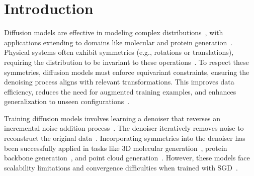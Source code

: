 \vspace{-0.5cm}
\section{Introduction}
\label{sec:intro}


Diffusion models are effective in modeling complex distributions~, with applications extending to domains like molecular and protein generation~. Physical systems often exhibit symmetries (e.g., rotations or translations), requiring the distribution to be invariant to these operations~.  To respect these symmetries, diffusion models must enforce equivariant constraints, ensuring the denoising process aligns with relevant transformations. This improves data efficiency, reduces the need for augmented training examples, and enhances generalization to unseen configurations~.

Training diffusion models involves learning a denoiser that reverses an incremental noise addition process~. The denoiser iteratively removes noise to reconstruct the original data~. Incorporating symmetries into the denoiser has been successfully applied in tasks like 3D molecular generation~, protein backbone generation~, and point cloud generation~. However, these models face scalability limitations and convergence difficulties when trained with SGD~.


